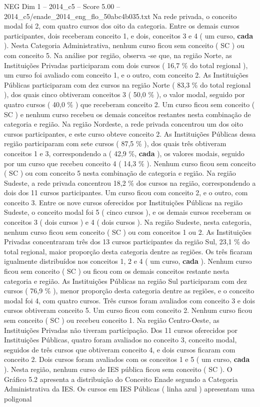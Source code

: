 \begin{textsample}{NEG Dim 1 – 2014\_c5 – Score 5.00 – 2014\_c5/enade\_2014\_eng\_flo\_50abc4b035.txt}
Na rede privada, o conceito modal foi 2, com quatro cursos dos oito da categoria.
Entre os demais cursos participantes, dois receberam conceito 1, e dois, conceitos 3 e 4 ( um curso, \textbf{cada} ).
Nesta Categoria Administrativa, nenhum curso ficou sem conceito ( SC ) ou com conceito 5.
Na análise por região, observa -se que, na região Norte, as Instituições Privadas participaram com dois cursos ( 16,7 \% do total regional ), um curso foi avaliado com conceito 1, e o outro, com conceito 2.
As Instituições Públicas participaram com dez cursos na região Norte ( 83,3 \% do total regional ), dos quais cinco obtiveram conceitos 3 ( 50,0 \% ), o valor modal, seguido por quatro cursos ( 40,0 \% ) que receberam conceito 2.
Um curso ficou sem conceito ( SC ) e nenhum curso recebeu os demais conceitos restantes nesta combinação de categoria e região.
Na região Nordeste, a rede privada concentrou um dos oito cursos participantes, e este curso obteve conceito 2.
As Instituições Públicas dessa região participaram com sete cursos ( 87,5 \% ), dos quais três obtiveram conceitos 1 e 3, correspondendo a ( 42,9 \%, \textbf{cada} ), os valores modais, seguido por um curso que recebeu conceito 4 ( 14,3 \% ).
Nenhum curso ficou sem conceito ( SC ) ou com conceito 5 nesta combinação de categoria e região.
Na região Sudeste, a rede privada concentrou 18,2 \% dos cursos na região, correspondendo a dois dos 11 cursos participantes.
Um curso ficou com conceito 2, e o outro, com conceito 3.
Entre os nove cursos oferecidos por Instituições Públicas na região Sudeste, o conceito modal foi 5 ( cinco cursos ), e os demais cursos receberam os conceitos 3 ( dois cursos ) e 4 ( dois cursos ).
Na região Sudeste, nesta categoria, nenhum curso ficou sem conceito ( SC ) ou com conceitos 1 ou 2.
As Instituições Privadas concentraram três dos 13 cursos participantes da região Sul, 23,1 \% do total regional, maior proporção desta categoria dentre as regiões.
Os três ficaram igualmente distribuídos nos conceitos 1, 2 e 4 ( um curso, \textbf{cada} ).
Nenhum curso ficou sem conceito ( SC ) ou ficou com os demais conceitos restante nesta categoria e região.
As Instituições Públicas na região Sul participaram com dez cursos ( 76,9 \% ), menor proporção desta categoria dentre as regiões, e o conceito modal foi 4, com quatro cursos.
Três cursos foram avaliados com conceito 3 e dois cursos obtiveram conceito 5.
Um curso ficou com conceito 2.
Nenhum curso ficou sem conceito ( SC ) ou recebeu conceito 1.
Na região Centro-Oeste, as Instituições Privadas não tiveram participação.
Dos 11 cursos oferecidos por Instituições Públicas, quatro foram avaliados no conceito 3, conceito modal, seguidos de três cursos que obtiveram conceito 4, e dois cursos ficaram com conceito 2.
Dois cursos foram avaliados com os conceitos 1 e 5 ( um curso, \textbf{cada} ).
Nesta região, nenhum curso de IES pública ficou sem conceito ( SC ).
O Gráfico 5.2 apresenta a distribuição do Conceito Enade segundo a Categoria Administrativa da IES.
Os cursos em IES Públicas ( linha azul ) apresentam uma poligonal

\end{textsample}

